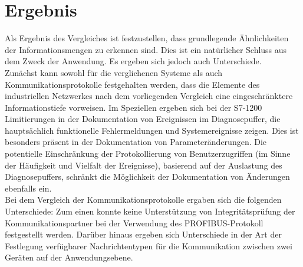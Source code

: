 \section{Ergebnis}
Als Ergebnis des Vergleiches ist festzustellen, dass grundlegende Ähnlichkeiten der Informationsmengen zu erkennen sind. Dies ist ein natürlicher Schluss aus dem Zweck der Anwendung. Es ergeben sich jedoch auch Unterschiede. \\

Zunächst kann sowohl für die verglichenen Systeme als auch Kommunikationsprotokolle festgehalten werden, dass die Elemente des industriellen Netzwerkes nach dem vorliegenden Vergleich eine eingeschränktere Informationstiefe vorweisen. Im Speziellen ergeben sich bei der S7-1200 Limitierungen in der Dokumentation von Ereignissen im Diagnosepuffer, die hauptsächlich funktionelle Fehlermeldungen und Systemereignisse zeigen. Dies ist besonders präsent in der Dokumentation von Parameteränderungen. Die potentielle Einschränkung der Protokollierung von Benutzerzugriffen (im Sinne der Häufigkeit und Vielfalt der Ereignisse), basierend auf der Auslastung des Diagnosepuffers, schränkt die Möglichkeit der Dokumentation von Änderungen ebenfalls ein. \\

Bei dem Vergleich der Kommunikationsprotokolle ergaben sich die folgenden Unterschiede: Zum einen konnte keine Unterstützung von Integritätsprüfung der Kommunikationspartner bei der Verwendung des PROFIBUS-Protokoll festgestellt werden. Darüber hinaus ergeben sich Unterschiede in der Art der Festlegung verfügbarer Nachrichtentypen für die Kommunikation zwischen zwei Geräten auf der Anwendungsebene.

